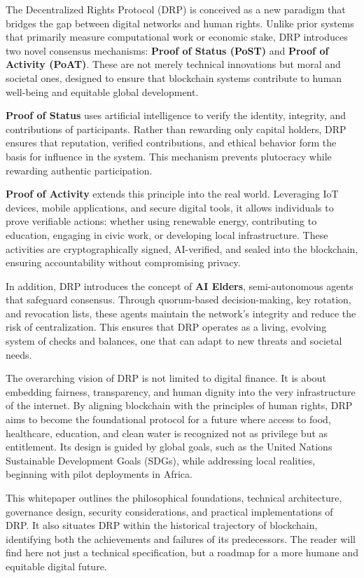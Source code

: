 \documentclass[11pt,a4paper]{article}
\begin{document}
The Decentralized Rights Protocol (DRP) is conceived as a new paradigm that bridges the gap between digital networks and human rights. Unlike prior systems that primarily measure computational work or economic stake, DRP introduces two novel consensus mechanisms: \textbf{Proof of Status (PoST)} and \textbf{Proof of Activity (PoAT)}. These are not merely technical innovations but moral and societal ones, designed to ensure that blockchain systems contribute to human well-being and equitable global development.

\textbf{Proof of Status} uses artificial intelligence to verify the identity, integrity, and contributions of participants. Rather than rewarding only capital holders, DRP ensures that reputation, verified contributions, and ethical behavior form the basis for influence in the system. This mechanism prevents plutocracy while rewarding authentic participation.

\textbf{Proof of Activity} extends this principle into the real world. Leveraging IoT devices, mobile applications, and secure digital tools, it allows individuals to prove verifiable actions: whether using renewable energy, contributing to education, engaging in civic work, or developing local infrastructure. These activities are cryptographically signed, AI-verified, and sealed into the blockchain, ensuring accountability without compromising privacy.

In addition, DRP introduces the concept of \textbf{AI Elders}, semi-autonomous agents that safeguard consensus. Through quorum-based decision-making, key rotation, and revocation lists, these agents maintain the network's integrity and reduce the risk of centralization. This ensures that DRP operates as a living, evolving system of checks and balances, one that can adapt to new threats and societal needs.

The overarching vision of DRP is not limited to digital finance. It is about embedding fairness, transparency, and human dignity into the very infrastructure of the internet. By aligning blockchain with the principles of human rights, DRP aims to become the foundational protocol for a future where access to food, healthcare, education, and clean water is recognized not as privilege but as entitlement. Its design is guided by global goals, such as the United Nations Sustainable Development Goals (SDGs), while addressing local realities, beginning with pilot deployments in Africa.

This whitepaper outlines the philosophical foundations, technical architecture, governance design, security considerations, and practical implementations of DRP. It also situates DRP within the historical trajectory of blockchain, identifying both the achievements and failures of its predecessors. The reader will find here not just a technical specification, but a roadmap for a more humane and equitable digital future.
\end{document}
